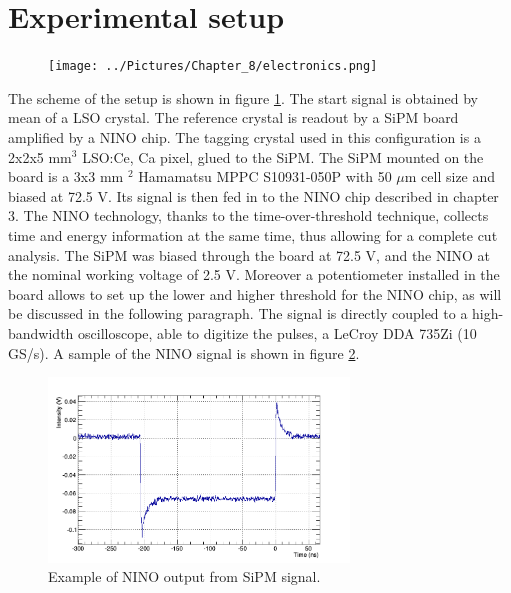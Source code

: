 \section{Experimental setup}

\begin{figure}[htbp]
\begin{center}
\texttt{[image: ../Pictures/Chapter\_8/electronics.png]}
\end{center}
\caption[]{}
\label{fig:setup}
\end{figure}
The scheme of the setup is shown in figure \ref{fig:setup}.
The start signal is obtained by mean of a LSO crystal. The reference crystal is readout by a SiPM board amplified by a NINO chip. 
The tagging crystal used in this configuration is a 2x2x5 mm$^{3}$ LSO:Ce, Ca pixel, glued to the SiPM.
The SiPM mounted on the board is a 3x3 mm $^{2}$ Hamamatsu MPPC S10931-050P with 50 $\mu$m cell size and biased at 72.5 V.
Its signal is then fed in to the NINO chip described in chapter 3. The NINO technology, thanks to the time-over-threshold technique, collects time and energy information at the same time, thus allowing for a complete cut analysis.
The SiPM was biased through the board at 72.5 V, and the NINO at the nominal working voltage of 2.5 V. Moreover a potentiometer installed in the board allows to set up the lower and higher threshold for the NINO chip, as will be discussed in the following paragraph.
The signal is directly coupled to a high-bandwidth oscilloscope, able to digitize the pulses, a LeCroy DDA 735Zi (10 GS/s).
A sample of the NINO signal is shown in figure \ref{fig:NINO_sign}.
\begin{figure}[htbp]
\begin{center}
\includegraphics[width=8cm]{../Pictures/Chapter_8/NINO_signal.png}
\end{center}
\caption[NINO signal sample]{Example of NINO output from SiPM signal.}
\label{fig:NINO_sign}
\end{figure}
